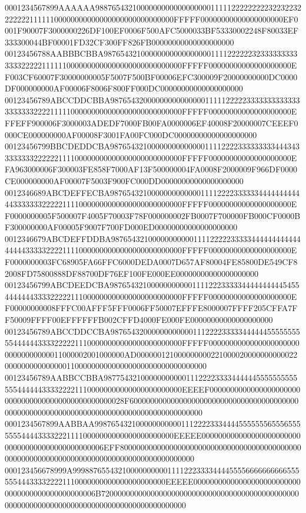 0001234567899AAAAAA9887654321000000000000000000111112222222223223223222222211111100000000000000000000000000000FFFFF00000000000000000000EF0001F90007F3000000226DF100EF0006F500AFC5000033BF53330002248F80033EF333300044BF00001FD32CF300FF826FB00000000000000000000
00123456788AABBBCBBA987654321000000000000000001111222222323333333333333222221111110000000000000000000000000000FFFFF00000000000000000000EF003CF60007F30000000005F5007F500BF00006EFC300009F20000000000DC0000DF000000000AF00006F8006F800FF000DC00000000000000000000
00123456789ABCCDDCBBA98765432000000000000000111112222233333333333333333333222211111000000000000000000000000000FFFFF00000000000000000000EFFEFF900006F3000003ADEDF7000FB00FA0000006EF40008F20000007CEEEF0000CE000000000AF00008F3001FA00FC000DC00000000000000000000
00123456799BBCDEDDCBA98765432100000000000000111122223333333334443433333333222222111100000000000000000000000000FFFFF00000000000000000000EFA963000006F300003FE858F7000AF13F500000004FA0008F2000009F966DF0000CE000000000AF00007F5003F900FC000DD00000000000000000000
0012346689ABCDEFFECBA98765432100000000000001111222233333344444444444433333332222211110000000000000000000000000FFFFF00000000000000000000EF0000000005F500007F4005F70003F78F000000002FB0007F700000FB000CF0000BF300000000AF00005F9007F700FD000ED00000000000000000000
0012346679ABCDEFFDDBA98765432100000000000111122222333334444444444444444433333222211110000000000000000000000000FFFFF00000000000000000000EF0000000003FC68905FA66FFC6000DEDA0007D657AF80004FE85800DE549CF82008FD75800888DF88700DF76EF100FE000EE00000000000000000000
00123456799ABCDEEDCBA98765432100000000000111122233333444444444454554444444333322222111000000000000000000000000FFFFF00000000000000000000EF00000000008FFFC00AFFF5FFF0006FF50007EFFFE8000007FFFF205CFFA7FF50009FFFF00EFFFFFFB002CFFD4000FE000FE00000000000000000000
00123456789ABCCDDCCBA98765432000000000000111222233333444444555555555544444433332222211100000000000000000000000FFFFF000000000000000000000000000000000011000002001000000AD0000001210000000002210000200000000000220000000000000001100000000000000000000000000000000
00123456789AABBCCBBA987754321000000000001112222333344444455555555555554444443333222211100000000000000000000000EEEEF000000000000000000000000000000000000000000000000028F60000000000000000000000000000000000000000000000000000000000000000000000000000000000000000
0001234567899AABBAA9987654321000000000001112222333444455555556555655555554444333322211110000000000000000000000EEEEE000000000000000000000000000000000000000000000006EFF800000000000000000000000000000000000000000000000000000000000000000000000000000000000000000
000123456678999A9998876554321000000000011112223333444455556666666666555555444333322221110000000000000000000000EEEEE000000000000000000000000000000000000000000000006B72000000000000000000000000000000000000000000000000000000000000000000000000000000000000000000
